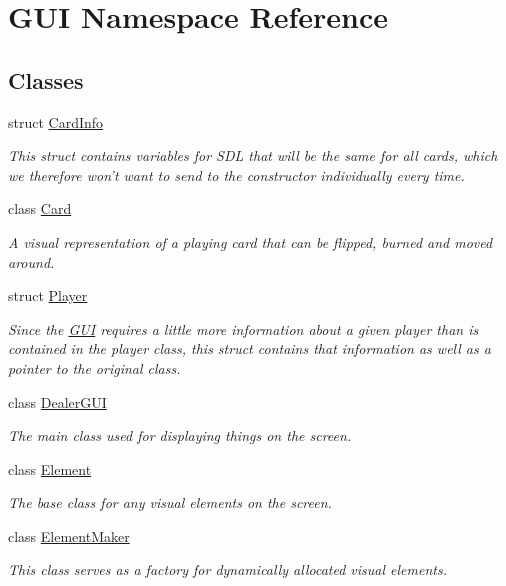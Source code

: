 \hypertarget{namespaceGUI}{\section{G\-U\-I Namespace Reference}
\label{namespaceGUI}
}
\subsection*{Classes}
\begin{DoxyCompactItemize}
\item 
struct \hyperlink{structGUI_1_1CardInfo}{Card\-Info}
\begin{DoxyCompactList}\small\item\em This struct contains variables for S\-D\-L that will be the same for all cards, which we therefore won't want to send to the constructor individually every time. \end{DoxyCompactList}\item 
class \hyperlink{classGUI_1_1Card}{Card}
\begin{DoxyCompactList}\small\item\em A visual representation of a playing card that can be flipped, burned and moved around. \end{DoxyCompactList}\item 
struct \hyperlink{structGUI_1_1Player}{Player}
\begin{DoxyCompactList}\small\item\em Since the \hyperlink{namespaceGUI}{G\-U\-I} requires a little more information about a given player than is contained in the player class, this struct contains that information as well as a pointer to the original class. \end{DoxyCompactList}\item 
class \hyperlink{classGUI_1_1DealerGUI}{Dealer\-G\-U\-I}
\begin{DoxyCompactList}\small\item\em The main class used for displaying things on the screen. \end{DoxyCompactList}\item 
class \hyperlink{classGUI_1_1Element}{Element}
\begin{DoxyCompactList}\small\item\em The base class for any visual elements on the screen. \end{DoxyCompactList}\item 
class \hyperlink{classGUI_1_1ElementMaker}{Element\-Maker}
\begin{DoxyCompactList}\small\item\em This class serves as a factory for dynamically allocated visual elements. \end{DoxyCompactList}\item 

\end{DoxyCompactItemize}
